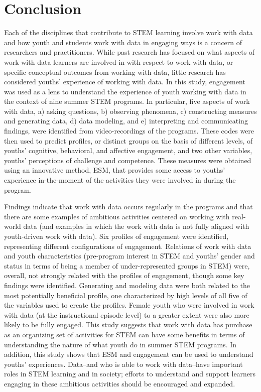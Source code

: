 \documentclass[]{msu-thesis}
\theoremstyle{definition}
\theoremstyle{definition}
\theoremstyle{definition}
\theoremstyle{remark}
\begin{document}
\section{Conclusion}\label{conclusion}

Each of the disciplines that contribute to STEM learning involve work
with data and how youth and students work with data in engaging ways is
a concern of researchers and practitioners. While past research has
focused on what aspects of work with data learners are involved in with
respect to work with data, or specific conceptual outcomes from working
with data, little research has considered youths' experience of working
with data. In this study, engagement was used as a lens to understand
the experience of youth working with data in the context of nine summer
STEM programs. In particular, five aspects of work with data, a) asking
questions, b) observing phenomena, c) constructing measures and
generating data, d) data modeling, and e) interpreting and communicating
findings, were identified from video-recordings of the programs. These
codes were then used to predict profiles, or distinct groups on the
basis of different levels, of youths' cognitive, behavioral, and
affective engagement, and two other variables, youths' perceptions of
challenge and competence. These measures were obtained using an
innovative method, ESM, that provides some access to youths' experience
in-the-moment of the activities they were involved in during the
program.

Findings indicate that work with data occurs regularly in the programs
and that there are some examples of ambitious activities centered on
working with real-world data (and examples in which the work with data
is not fully aligned with youth-driven work with data). Six profiles of
engagement were identified, representing different configurations of
engagement. Relations of work with data and youth characteristics
(pre-program interest in STEM and youths' gender and status in terms of
being a member of under-represented groups in STEM) were, overall, not
strongly related with the profiles of engagement, though some key
findings were identified. Generating and modeling data were both related
to the most potentially beneficial profile, one characterized by high
levels of all five of the variables used to create the profiles. Female
youth who were involved in work with data (at the instructional episode
level) to a greater extent were also more likely to be fully engaged.
This study suggests that work with data has purchase as an organizing
set of activities for STEM can have some benefits in terms of
understanding the nature of what youth do in summer STEM programs. In
addition, this study shows that ESM and engagement can be used to
understand youths' experiences. Data--and who is able to work with
data--have important roles in STEM learning and in society; efforts to
understand and support learners engaging in these ambitious activities
should be encouraged and expanded.
\end{document}
